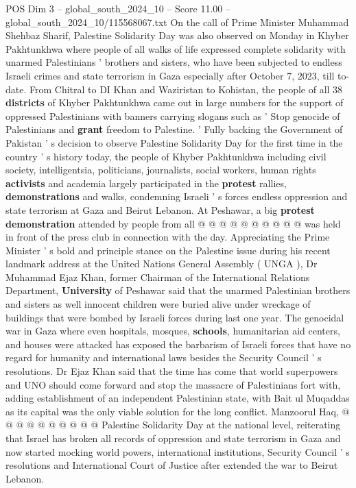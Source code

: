 \begin{textsample}{POS Dim 3 – global\_south\_2024\_10 – Score 11.00 – global\_south\_2024\_10/115568067.txt}  \label{ex:f3_pos_399}
On the call of Prime Minister Muhammad Shehbaz Sharif, Palestine Solidarity Day was also observed on Monday in Khyber Pakhtunkhwa where people of all walks of life expressed complete solidarity with unarmed Palestinians ' brothers and sisters, who have been subjected to endless Israeli crimes and state terrorism in Gaza especially after October 7, 2023, till to-date.
From Chitral to DI Khan and Waziristan to Kohistan, the people of all 38 \textbf{districts} of Khyber Pakhtunkhwa came out in large numbers for the support of oppressed Palestinians with banners carrying slogans such as ' Stop genocide of Palestinians and \textbf{grant} freedom to Palestine. ' Fully backing the Government of Pakistan ' s decision to observe Palestine Solidarity Day for the first time in the country ' s history today, the people of Khyber Pakhtunkhwa including civil society, intelligentsia, politicians, journalists, social workers, human rights \textbf{activists} and academia largely participated in the \textbf{protest} rallies, \textbf{demonstrations} and walks, condemning Israeli ' s forces endless oppression and state terrorism at Gaza and Beirut Lebanon.
At Peshawar, a big \textbf{protest} \textbf{demonstration} attended by people from all @ @ @ @ @ @ @ @ @ @ was held in front of the press club in connection with the day.
Appreciating the Prime Minister ' s bold and principle stance on the Palestine issue during his recent landmark address at the United Nations General Assembly ( UNGA ), Dr Muhammad Ejaz Khan, former Chairman of the International Relations Department, \textbf{University} of Peshawar said that the unarmed Palestinian brothers and sisters as well innocent children were buried alive under wreckage of buildings that were bombed by Israeli forces during last one year.
The genocidal war in Gaza where even hospitals, mosques, \textbf{schools}, humanitarian aid centers, and houses were attacked has exposed the barbarism of Israeli forces that have no regard for humanity and international laws besides the Security Council ' s resolutions.
Dr Ejaz Khan said that the time has come that world superpowers and UNO should come forward and stop the massacre of Palestinians fort with, adding establishment of an independent Palestinian state, with Bait ul Muqaddas as its capital was the only viable solution for the long conflict.
Manzoorul Haq, @ @ @ @ @ @ @ @ @ @ Palestine Solidarity Day at the national level, reiterating that Israel has broken all records of oppression and state terrorism in Gaza and now started mocking world powers, international institutions, Security Council ' s resolutions and International Court of Justice after extended the war to Beirut Lebanon.

\end{textsample}
